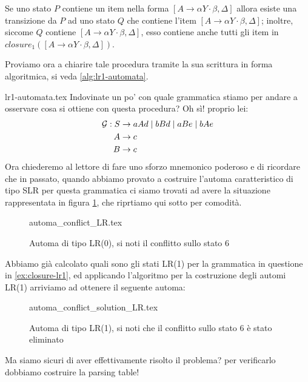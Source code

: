 \documentclass[class=book, crop=false, oneside, 12pt]{standalone}
\begin{document}
\noindent Se uno stato \(P\) contiene un item nella forma \([A \to \alpha Y \cdot \beta, \Delta]\) allora esiste una transizione da \(P\) ad uno stato \(Q\) che contiene l'item \([A \to \alpha Y \cdot \beta , \Delta]\); inoltre, siccome \(Q\) contiene \([A \to \alpha Y \cdot \beta , \Delta]\), esso contiene anche tutti gli item in \(closure_1([A \to \alpha Y \cdot \beta , \Delta])\).

Proviamo ora a chiarire tale procedura tramite la sua scrittura in forma algoritmica, si veda \ref{alg:lr1-automata}.

{lr1-automata.tex}
Indovinate un po' con quale grammatica stiamo per andare a osservare cosa si ottiene con questa procedura? Oh sì! proprio lei:
\begin{align}
    \label{eq:ex3-slr1-grammarrrrrr-again-and-again}
    \mathcal{G}: S &\to aAd \mid bBd \mid aBe \mid bAe \\
    A &\to c \nonumber \\ \notag
    B &\to c \notag
\end{align}
Ora chiederemo al lettore di fare uno sforzo mnemonico poderoso e di ricordare che in passato, quando abbiamo provato a costruire l'automa caratteristico di tipo SLR per questa grammatica ci siamo trovati ad avere la situazione rappresentata in figura \ref{fig:lr0-automata_conflict}, che riprtiamo qui sotto per comodità.
\begin{figure}[H]
    \centering
    {automa_conflict_LR.tex}
    \caption{Automa di tipo LR(0), si noti il conflitto sullo stato 6}
    \label{fig:lr0-automata_conflict}
\end{figure}
Abbiamo già calcolato quali sono gli stati LR(1) per la grammatica in questione in \ref{ex:closure-lr1}, ed applicando l'algoritmo per la costruzione degli automi LR(1) arriviamo ad ottenere il seguente automa:
\begin{figure}[H]
    \centering
    {automa_conflict_solution_LR.tex}
    \caption{Automa di tipo LR(1), si noti che il conflitto sullo stato 6 è stato eliminato}
    \label{fig:lr1-automata_no-conflict}
\end{figure}
Ma siamo sicuri di aver effettivamente risolto il problema? per verificarlo dobbiamo costruire la parsing table!
\end{document}
